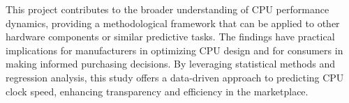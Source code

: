 This project contributes to the broader understanding of CPU performance dynamics, providing a methodological framework that can be applied to other hardware components or similar predictive tasks. The findings have practical implications for manufacturers in optimizing CPU design and for consumers in making informed purchasing decisions. By leveraging statistical methods and regression analysis, this study offers a data-driven approach to predicting CPU clock speed, enhancing transparency and efficiency in the marketplace.\\


\newpage